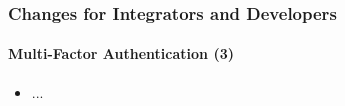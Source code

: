 %

\begin{frame}[fragile]
	\frametitle{Changes for Integrators and Developers}
	\framesubtitle{Multi-Factor Authentication (3)}


	\begin{itemize}
		\item ...
	\end{itemize}

\end{frame}

